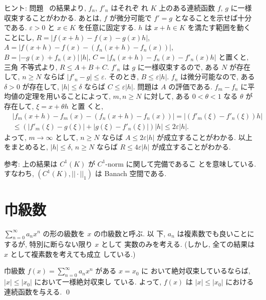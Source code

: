 \documentclass[12pt,twoside]{jarticle}
\begin{document}
\noindent ヒント: 問題 \ の結果より, $f_n$, $f'_n$ はそれぞ
れ $K$ 上のある連続函数 $f$, $g$ に一様収束することがわかる. あとは, %
$f$ が微分可能で $f'=g$ となることを示せば十分である. %
$\varepsilon > 0$ と $x\in K$ を任意に固定する. %
$h$ は $x+h\in K$ を満たす範囲を動くことにし, %
$R=|f(x+h)-f(x)-g(x)h|$, $A=|f(x+h)-f(x)-(f_n(x+h)-f_n(x))|$, %
$B=|-g(x)+f_n(x)|\,|h|$, $C=|f_n(x+h)-f_n(x)-f'_n(x)h|$ と置くと, 三角
不等式より, $R \le A + B + C$. $f'_n$ は $g$ に一様収束するので, ある 
$N$ が存在して, $n\ge N$ ならば $|f'_n - g| \le \varepsilon$. %
そのとき, $B \le \varepsilon |h|$.  %
$f_n$ は微分可能なので, ある $\delta > 0$ が存在して, %
$|h|\le\delta$ ならば $C \le \varepsilon |h|$. %
問題は $A$ の評価である. %
$f_m - f_n$ に平均値の定理を用いることによって, $m,n \ge N$ に対して, 
ある $0 < \theta < 1$ なる $\theta$ が存在して, $\xi=x+\theta h$ と置
くと,
\begin{align*}
  & |f_m(x+h) -f_m(x) - (f_n(x+h) - f_n(x))|
  = |(f'_m(\xi) - f'_n(\xi)) h| 
  \\
  & \le ( |f'_m(\xi) - g(\xi)| + |g(\xi) - f'_n(\xi)|)|h|
  \le 2 \varepsilon |h|.
\end{align*}
よって, $m\to\infty$ として, %
$n\ge N$ ならば $A \le 2 \varepsilon |h|$ が成立することがわかる. %
以上をまとめると, $|h| \le \delta$, $n\ge N$ ならば %
$R \le 4 \varepsilon |h|$ が成立することがわかる.

\medskip
\begin{small}

\noindent 参考: 上の結果は $C^1(K)$ が $C^1$-norm に関して完備であるこ
とを意味している. すなわち, $(C^1(K), ||\cdot||_1)$ は Banach 空間である.

\end{small}


\section{巾級数}

$\sum\limits_{n=0}^\infty a_n x^n$ の形の級数を $x$ の巾級数と呼ぶ. 以
下, $a_n$ は複素数でも良いことにするが, 特別に断らない限り $x$ として
実数のみを考える. (しかし, 全ての結果は $x$ として複素数を考えても成立
している.)

\begin{question}
  巾級数 $f(x) = \sum\limits_{n=0}^\infty a_n x^n$ がある $x = x_0$ に
  おいて絶対収束しているならば, $|x| \le |x_0|$ において一様絶対収束し
  ている.  よって, $f(x)$ は $|x| \le |x_0|$ における連続函数を与える.
  \qed
\end{question}
\end{document}
